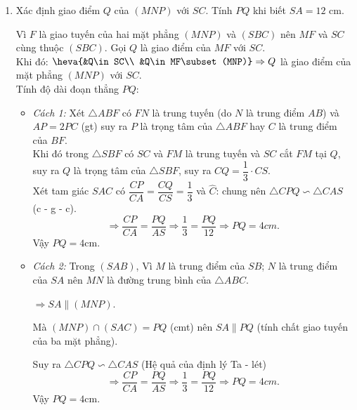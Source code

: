 \begin{bt}
{\begin{enumerate}[1.]
\begin{enumerate}[1.1.]
				\item Do $NP$ không song song với $BC$ và cùng nằm trên mặt phẳng $(ABC)$ nên gọi $F$ là giao điểm của $NP$ và $BC$ kéo dài.\\
				Ta có $\heva{&F\in BC\\ &BC\subset (SBC)}$ và $\heva{&F\in NP\\ &NP\subset (MNP)}$ $\Rightarrow \heva{&F\in (SBC)\\ &F\in (MNP)} \Rightarrow F$ là điểm chung thứ nhất của hai mặt phẳng $(MNP)$ và $(SBC)$. $\quad (3)$\\
				Tương tự, $M$ là điểm chung thứ hai của hai mặt phẳng $(MNP)$ và $(SBC)$. $\quad (4)$\\
				Từ $(3)$ và $(4)$, suy ra giao tuyến của hai mặt phẳng $(MNP)$ và $(SBC)$ là đường thẳng $MF$.
			\end{enumerate}
			\item Xác định giao điểm $Q$ của $(MNP)$ với $SC$. Tính $PQ$ khi biết $SA=12$ cm.
			
			Vì $F$ là giao tuyến của hai mặt phẳng $(MNP)$ và $(SBC)$ nên $MF$ và $SC$ cùng thuộc $(SBC)$. Gọi $Q$ là giao điểm của $MF$ với $SC$.\\
			Khi đó: $\heva{&Q\in SC\\ &Q\in MF\subset (MNP)}\Rightarrow Q$ là giao điểm của mặt phẳng $(MNP)$ với $SC$.\\
			Tính độ dài đoạn thẳng $PQ$:
			\begin{itemize}
				\item \textit{Cách 1:} Xét $\triangle ABF$ có $FN$ là trung tuyến (do $N$ là trung điểm $AB$) và $AP=2PC$ (gt) suy ra $P$ là trọng tâm của $\triangle ABF$ hay $C$ là trung điểm của $BF$.\\
				Khi đó trong $\triangle SBF$ có $SC$ và $FM$ là trung tuyến và $SC$ cắt $FM$ tại $Q$, suy ra $Q$ là trọng tâm của $\triangle SBF$, suy ra $CQ=\dfrac{1}{3}\cdot CS$.\\
				Xét tam giác $SAC$ có $\dfrac{CP}{CA}=\dfrac{CQ}{CS}=\dfrac{1}{3}$ và $\widehat C$: chung nên $\triangle CPQ \backsim \triangle CAS$ (c - g - c).
				$$\Rightarrow \dfrac{CP}{CA}=\dfrac{PQ}{AS}
				\Rightarrow \dfrac{1}{3}=\dfrac{PQ}{12}
				\Rightarrow PQ=4cm.$$
				Vậy $PQ=4$cm.
				\item \textit{Cách 2:} Trong $(SAB)$, Vì $M$ là trung điểm của $SB$; $N$ là trung điểm của $SA$ nên $MN$ là đường trung bình của $\triangle ABC$.
				
				$\Rightarrow SA\parallel (MNP)$.
				
				Mà $(MNP)\cap (SAC)=PQ$ (cmt) nên $SA\parallel PQ$ (tính chất giao tuyến của ba mặt phẳng).
				
				Suy ra $\triangle CPQ \backsim \triangle CAS$ (Hệ quả của định lý Ta - lét)
				$$\Rightarrow \dfrac{CP}{CA}=\dfrac{PQ}{AS}
				\Rightarrow \dfrac{1}{3}=\dfrac{PQ}{12}
				\Rightarrow PQ=4cm.$$
				Vậy $PQ=4$cm.
			\end{itemize}			
		\end{enumerate}
	}
\end{bt}

